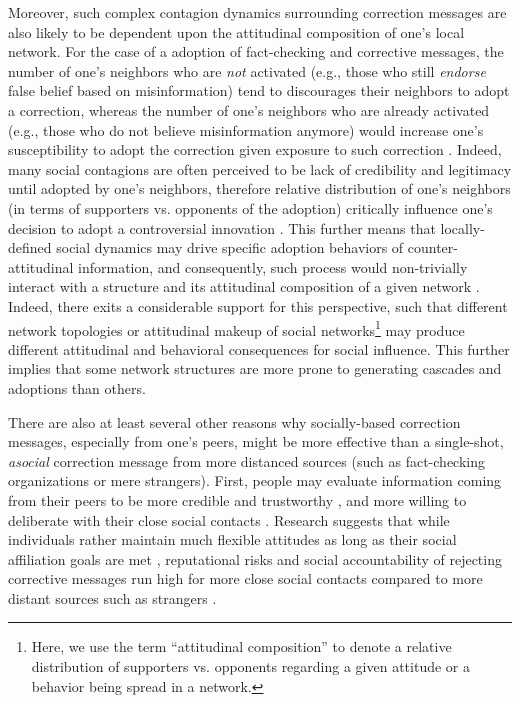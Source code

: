 \documentclass[man, 12pt, a4paper, noextraspace]{apa6}
\begin{document}
    Moreover, such complex contagion dynamics surrounding correction messages are also likely to be dependent upon the attitudinal composition of one's local network. For the case of a adoption of fact-checking and corrective messages, the number of one's neighbors who are \emph{not} activated (e.g., those who still \emph{endorse} false belief based on misinformation) tend to discourages their neighbors to adopt a correction, whereas the number of one's neighbors who are already activated (e.g., those who do not believe misinformation anymore) would increase one's susceptibility to adopt the correction given exposure to such correction \parencites[i.e., a \enquote{\emph{contested}} contagion:][]{centola2007complex}[also see][]{friedkin2001norm}. Indeed, many social contagions are often perceived to be lack of credibility and legitimacy until adopted by one's neighbors, therefore relative distribution of one's neighbors (in terms of supporters vs. opponents of the adoption) critically influence one's decision to adopt a controversial innovation \parencite{larson2016social, gonzalez2017decoding, friedkin2001norm}. This further means that locally-defined social dynamics may drive specific adoption behaviors of counter-attitudinal information, and consequently, such process would non-trivially interact with a structure and its attitudinal composition of a given network \parencite[e.g.,][]{friedkin2001norm}. Indeed, there exits a considerable support for this perspective, such that different network topologies \parencite[][]{Centola2010Sience, siegel2009social} or attitudinal makeup of social networks\footnote{  Here, we use the term \enquote{attitudinal composition} to denote a relative distribution of supporters vs. opponents regarding a given attitude or a behavior being spread in a network.} \parencite[][]{levitan2008resistance, larson2016social, gonzalez2017decoding} may produce different attitudinal and behavioral consequences for social influence. This further implies that some network structures are more prone to generating cascades and adoptions than others.

  There are also at least several other reasons why socially-based correction messages, especially from one's peers, might be more effective than a single-shot, \emph{asocial} correction message from more distanced sources (such as fact-checking organizations or mere strangers). First, people may evaluate information coming from their peers to be more credible and trustworthy \parencite[e.g.,][]{metzger2010social}, and more willing to deliberate with their close social contacts \parencite{morey2012matters}. Research suggests that while individuals rather maintain much flexible attitudes as long as their social affiliation goals are met \parencite{levitanspy2017}, reputational risks and social accountability of rejecting corrective messages run high for more close social contacts compared to more distant sources such as strangers \parencite{margolin2017}.  
    
\end{document}
